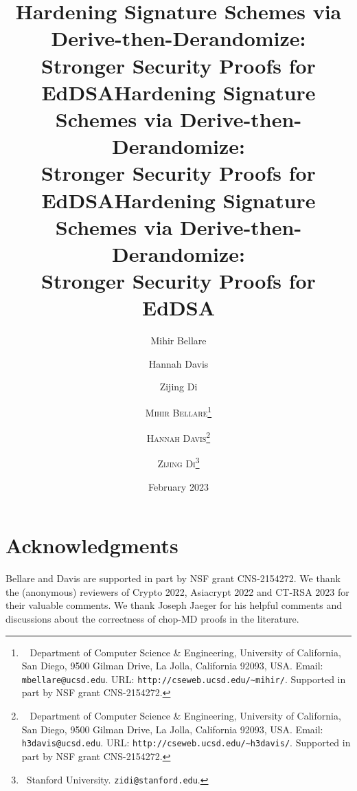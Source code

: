 \ifacm \documentclass{sig-alternate}
\makeatletter
\def\BellareEmail{\tt mbellare@ucsd.edu}
\def\BellareWebpage{\tt http://cseweb.ucsd.edu/\textasciitilde mihir/}
\def\BellareDept{Department of Computer Science \& Engineering}
\def\BellareCompany{University of California, San Diego}
\def\BellareAddress{9500 Gilman Drive, La Jolla, California 92093, USA}
\def\BellareThanks{
\BellareDept,
\BellareCompany,
\BellareAddress.
Email: {\tt \BellareEmail}.
URL: {\tt \BellareWebpage}.
Supported in part by NSF grant CNS-2154272.
}
\def\DavisEmail{\tt h3davis@ucsd.edu}
\def\DavisWebpage{\tt http://cseweb.ucsd.edu/\textasciitilde h3davis/}
\def\DavisDept{Department of Computer Science \& Engineering}
\def\DavisCompany{University of California, San Diego}
\def\DavisAddress{9500 Gilman Drive, La Jolla, California 92093, USA}
\def\DavisThanks{
	\DavisDept,
	\DavisCompany,
	\DavisAddress.
	Email: {\tt \DavisEmail}.
	URL: {\tt \DavisWebpage}.
	Supported in part by NSF grant CNS-2154272.
}
\newcommand{\titletext}{Hardening Signature Schemes via Derive-then-Derandomize: \\
Stronger Security Proofs for EdDSA}
\makeatother
\begin{document}
\setlength{\abovedisplayskip}{2pt}
\setlength{\belowdisplayskip}{2pt}
\setlength{\abovedisplayshortskip}{0pt}
\setlength{\belowdisplayshortskip}{2pt}




\ifllncs
\ifanonymous
\author{}
\institute{}
\title{\titletext}
\else
\title{\titletext}
\author{Mihir Bellare \and Hannah Davis \and Zijing Di}
\fi  %

\else %
\ifacm

\else %
\title{\textbf{\titletext\protect\vspace{0.3in}}}
\author{\textsc{Mihir Bellare}\thanks{\ \BellareThanks} \and \textsc{Hannah Davis}\thanks{\ \DavisThanks} \and \textsc{Zijing Di}\thanks{\ Stanford University. {\tt zidi@stanford.edu}.} \vspace{0.3in}}
\date{February 2023\vspace{0.2in}}
\fi %
\fi %

\maketitle


\begin{abstract}


\ifllncs\ifanonymous{}\fi\fi 
\end{abstract}

\ifacm\else\ifllncs\else
\newpage
\tableofcontents
\newpage
\fi\fi





%
%



%

%
%




\section*{Acknowledgments}

\ifllncs Bellare and Davis are supported in part by NSF grant CNS-2154272. \fi We thank the (anonymous) reviewers of Crypto 2022, Asiacrypt 2022 and CT-RSA 2023 for their valuable comments.
We thank Joseph Jaeger for his helpful comments and discussions about the correctness of chop-MD proofs in the literature.
\end{document}
